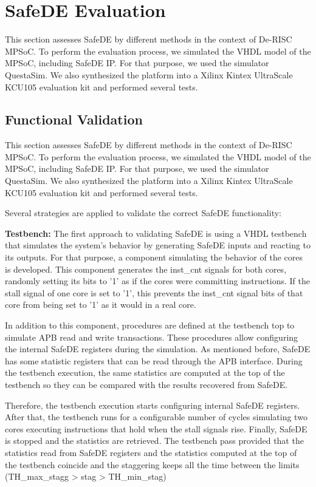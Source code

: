 \clearpage\section{SafeDE Evaluation}

This section assesses SafeDE by different methods in the context of De-RISC MPSoC. To perform the evaluation process, we simulated the VHDL model of the MPSoC, including SafeDE IP. For that purpose, we used the simulator QuestaSim. We also synthesized the platform into a Xilinx Kintex UltraScale KCU105 evaluation kit and performed several tests. 

\subsection{Functional Validation}

This section assesses SafeDE by different methods in the context of De-RISC MPSoC. To perform the evaluation process, we simulated the VHDL model of the MPSoC, including SafeDE IP. For that purpose, we used the simulator QuestaSim. We also synthesized the platform into a Xilinx Kintex UltraScale KCU105 evaluation kit and performed several tests. 

Several strategies are applied to validate the correct SafeDE functionality:

\textbf{Testbench:} The first approach to validating SafeDE is using a VHDL testbench that simulates the system's behavior by generating SafeDE inputs and reacting to its outputs. For that purpose, a component simulating the behavior of the cores is developed. This component generates the inst\_cnt signals for both cores, randomly setting its bits to '1' as if the cores were committing instructions. If the stall signal of one core is set to '1', this prevents the inst\_cnt signal bits of that core from being set to '1' as it would in a real core. 

In addition to this component,  procedures are defined at the testbench top to simulate APB read and write transactions. These procedures allow configuring the internal SafeDE registers during the simulation. As mentioned before, SafeDE has some statistic registers that can be read through the APB interface. During the testbench execution, the same statistics are computed at the top of the testbench so they can be compared with the results recovered from SafeDE. 

Therefore, the testbench execution starts configuring internal SafeDE registers. After that, the testbench runs for a configurable number of cycles simulating two cores executing instructions that hold when the stall signals rise. Finally, SafeDE is stopped and the statistics are retrieved. The testbench pass provided that the statistics read from SafeDE registers and the statistics computed at the top of the testbench coincide and the staggering keeps all the time between the limits (TH\_max\_stagg > stag > TH\_min\_stag)

